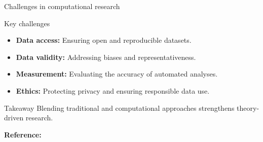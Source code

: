 \documentclass[handout]{beamer}
\begin{document}
\begin{frame}{Challenges in computational research}

    \begin{block}{Key challenges}
        \begin{itemize}
            \item \textbf{Data access:} Ensuring open and reproducible datasets.
            \item \textbf{Data validity:} Addressing biases and representativeness.
            \item \textbf{Measurement:} Evaluating the accuracy of automated analyses.
            \item \textbf{Ethics:} Protecting privacy and ensuring responsible data use.
        \end{itemize}
    \end{block}

    \vspace{0.5cm}
    \begin{block}{Takeaway}
        Blending traditional and computational approaches strengthens theory-driven research.
    \end{block}

    \vspace{0.3cm}
    \small \textbf{Reference:} \cite{vanAtteveldt2018}

\end{frame}
\end{document}

